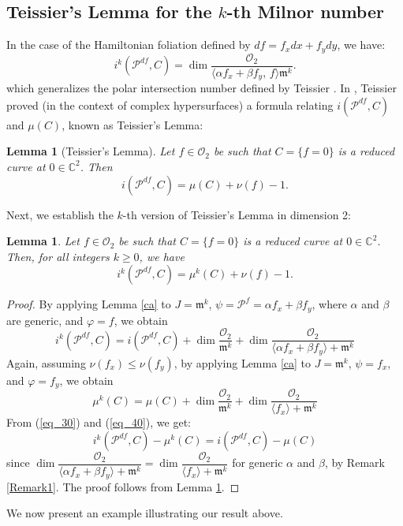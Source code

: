 \documentclass[12pt,letterpaper]{amsart}
\newcommand{\C}{\mathbb{C}}
\newcommand{\m}{\mathfrak{m}}
\newtheorem{lemma}[theorem]{Lemma}
\begin{document}
\subsection{Teissier's Lemma for the $k$-th Milnor number} 
 In the case of the Hamiltonian foliation defined by $df=f_x dx+f_y dy$, we have:
\[
i^{k}(\mathcal{P}^{df},C)=\dim\frac{\mathcal{O}_2}{\langle \alpha f_x+\beta f_y,\,f\rangle\m^{k}}.
\]
which generalizes the polar intersection number defined by Teissier \cite{Teissier}. In \cite[Chapter 4, Proposition 1.2]{Teissier}, Teissier proved (in the context of complex hypersurfaces) a formula relating $i(\mathcal{P}^{df},C)$ and $\mu(C)$, known as Teissier's Lemma:
\begin{lemma}[Teissier's Lemma]\label{lemma_tei}
    Let $f\in\mathcal{O}_2$ be such that $C=\{f=0\}$ is a reduced curve at $0\in\C^2$. Then
\[i(\mathcal{P}^{df},C)=\mu(C)+\nu(f)-1.\]
\end{lemma}

Next, we establish the $k$-th version of Teissier's Lemma \cite[Chapter 4, Proposition 1.2]{Teissier} in dimension 2:
\begin{lemma}
Let $f\in\mathcal{O}_2$ be such that $C=\{f=0\}$ is a reduced curve at $0\in\C^2$. Then, for all integers $k\geq 0$, we have 
\[i^{k}(\mathcal{P}^{df},C)=\mu^{k}(C)+\nu(f)-1.\]
\end{lemma}
\begin{proof}
By applying Lemma \ref{ca} to $J=\m^{k}$, $\psi=\mathcal{P}^{f}=\alpha f_x+\beta f_y$, where $\alpha$ and $\beta$ are generic, and $\varphi=f$, we obtain 
\begin{equation}\label{eq_30}
i^k(\mathcal{P}^{df},C)=i(\mathcal{P}^{df},C)+\dim\frac{\mathcal{O}_2}{\m^k}+\dim\frac{\mathcal{O}_2}{\langle \alpha f_x+\beta f_y\rangle+\m^k}
\end{equation}
Again, assuming $\nu(f_x)\leq\nu(f_y)$, by applying Lemma \ref{ca} to $J=\m^{k}$, $\psi=f_x$, and $\varphi=f_y$, we obtain 
\begin{equation}\label{eq_40}
\mu^{k}(C)=\mu(C)+\dim\frac{\mathcal{O}_2}{\m^k}+\dim\frac{\mathcal{O}_2}{\langle f_x\rangle+\m^k}
\end{equation}
From (\ref{eq_30}) and (\ref{eq_40}), we get:
\[i^k(\mathcal{P}^{df},C)-\mu^{k}(C)=i(\mathcal{P}^{df},C)-\mu(C)\]
since $\dim\dfrac{\mathcal{O}_2}{\langle \alpha f_x+\beta f_y\rangle+\m^k}=\dim\dfrac{\mathcal{O}_2}{\langle f_x\rangle+\m^k}$ for generic $\alpha$ and $\beta$, by Remark \ref{Remark1}. The proof follows from Lemma \ref{lemma_tei}.
\end{proof}
We now present an example illustrating our result above.
\end{document}
